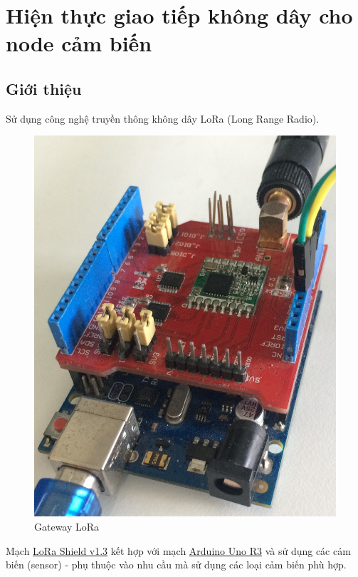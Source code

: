 \chapter{Hiện thực giao tiếp không dây cho node cảm biến}
\section{Giới thiệu}
Sử dụng công nghệ truyền thông không dây LoRa \cite{tl12} (Long Range Radio).\\
\begin{center}
\begin{figure}[htp]
\begin{center}
\includegraphics[scale=0.12]{image4/lora.jpg}
\end{center}
\caption{Gateway LoRa}
\end{figure}
\end{center}
Mạch \href{http://www.dragino.com/products/module/item/102-lora-shield.html}{LoRa Shield v1.3} kết hợp với mạch  \href{https://store.arduino.cc/usa/arduino-uno-rev3}{Arduino Uno R3} và sử dụng các cảm biến (sensor) - phụ thuộc vào nhu cầu mà sử dụng các loại cảm biến phù hợp.
